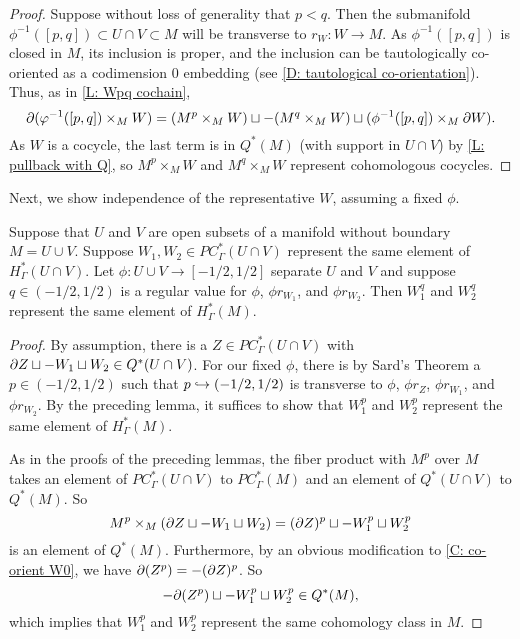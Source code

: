 \begin{proof}
	Suppose without loss of generality that $p<q$.
	Then the submanifold $\phi^{-1}([p,q]) \subset U \cap V \subset M$ will be transverse to $r_W \colon W \to M$.
	As $\phi^{-1}([p,q])$ is closed in $M$, its inclusion is proper, and the inclusion can be tautologically co-oriented as a codimension $0$ embedding (see \cref{D: tautological co-orientation}).
	Thus, as in \cref{L: Wpq cochain}, $$\partial(\varphi^{-1}([p,q])\times_{M} W ) = (M^p \times_{M} W)\sqcup -(M^q \times_{M} W) \sqcup (\phi^{-1}([p,q])\times_{M} \partial W).$$
	As $W$ is a cocycle, the last term is in $Q^*(M)$ (with support in $U \cap V$) by \cref{L: pullback with Q}, so $M^p \times_{M} W$ and $M^q \times_{M} W$ represent cohomologous cocycles.
\end{proof}

Next, we show independence of the representative $W$, assuming a fixed $\phi$.

\begin{lemma}\label{L: different W}
	Suppose that $U$ and $V$ are open subsets of a manifold without boundary $M = U \cup V$.
	Suppose $W_1, W_2 \in PC^*_\Gamma(U \cap V)$ represent the same element of $H^*_\Gamma(U \cap V)$.
	Let $\phi \colon U \cup V \to [-1/2,1/2]$ separate $U$ and $V$ and suppose $q \in (-1/2,1/2)$ is a regular value for $\phi$, $\phi r_{W_1}$, and $\phi r_{W_2}$.
	Then $W_1^q$ and $W_2^q$ represent the same element of $H^*_\Gamma(M)$.
\end{lemma}

\begin{proof}
	By assumption, there is a $Z \in PC^*_{\Gamma}(U \cap V)$ with $\partial Z \sqcup -W_1 \sqcup W_2 \in Q^*(U \cap V)$.
	For our fixed $\phi$, there is by Sard's Theorem a $p \in (-1/2,1/2)$ such that $p \hookrightarrow (-1/2,1/2)$ is transverse to $\phi$, $\phi r_Z$, $\phi r_{W_1}$, and $\phi r_{W_2}$.
	By the preceding lemma, it suffices to show that $W_1^p$ and $W_2^p$ represent the same element of $H^*_\Gamma(M)$.

	As in the proofs of the preceding lemmas, the fiber product with $M^p$ over $M$ takes an element of $PC^*_\Gamma(U \cap V)$ to $PC^*_\Gamma(M)$ and an element of $Q^*(U \cap V)$ to $Q^*(M)$.
	So
	$$M^p \times_{M}(\partial Z \sqcup -W_1 \sqcup W_2) = (\partial Z)^p \sqcup -W_1^p \sqcup W_2^p$$
	is an element of $Q^*(M)$.
	Furthermore, by an obvious modification to \cref{C: co-orient W0}, we have $\partial (Z^p) = -(\partial Z)^p$.
	So $$-\partial (Z^p) \sqcup -W_1^p \sqcup W_2^p \in Q^*(M),$$
	which implies that $W_1^p$ and $W_2^p$ represent the same cohomology class in $M$.
\end{proof}

